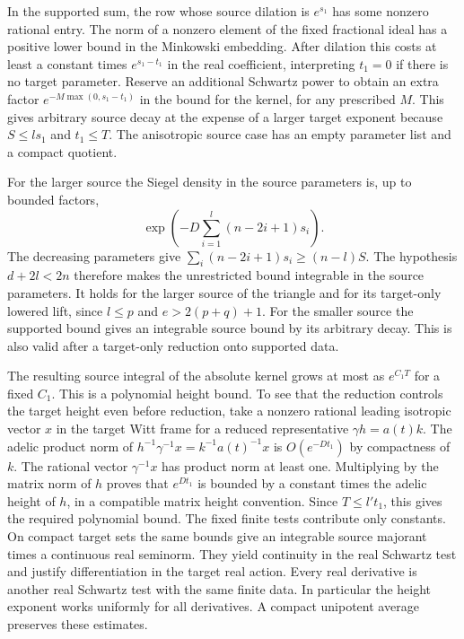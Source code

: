 In the supported sum, the row whose source dilation is \(e^{s_1}\)
has some nonzero rational entry. The norm of a nonzero element
of the fixed fractional ideal has a positive lower bound in the
Minkowski embedding. After dilation this costs at least a constant
times \(e^{s_1-t_1}\) in the real coefficient, interpreting \(t_1=0\)
if there is no target parameter. Reserve an additional Schwartz
power to obtain an extra factor \(e^{-M\max(0,s_1-t_1)}\) in
the bound for the kernel, for any prescribed \(M\). This gives
arbitrary source decay at the expense of a larger target exponent
because \(S\le l s_1\) and \(t_1\le T\). The anisotropic source
case has an empty parameter list and a compact quotient.

For the larger source the Siegel density in the source parameters
is, up to bounded factors,
\[
 \exp\!\left(-D\sum_{i=1}^l(n-2i+1)s_i\right).
\]
The decreasing parameters give
\(\sum_i(n-2i+1)s_i\ge(n-l)S\). The hypothesis
\(d+2l<2n\) therefore makes the unrestricted bound integrable
in the source parameters. It holds for the larger source of the
triangle and for its target-only lowered lift, since \(l\le p\)
and \(e>2(p+q)+1\). For the smaller source the supported bound
gives an integrable source bound by its arbitrary decay. This is
also valid after a target-only reduction onto supported data.

The resulting source integral of the absolute kernel grows at
most as \(e^{C_1 T}\) for a fixed \(C_1\). This is a polynomial
height bound. To see that the reduction controls the target
height even before reduction, take a nonzero rational leading
isotropic vector \(x\) in the target Witt frame for a reduced
representative \(\gamma h=a(t)k\). The adelic product norm of
\(h^{-1}\gamma^{-1}x=k^{-1}a(t)^{-1}x\) is
\(O(e^{-D t_1})\) by compactness of \(k\). The rational vector
\(\gamma^{-1}x\) has product norm at least one. Multiplying by
the matrix norm of \(h\) proves that \(e^{D t_1}\) is bounded by
a constant times the adelic height of \(h\), in a compatible
matrix height convention. Since \(T\le l't_1\), this gives the
required polynomial bound. The fixed finite tests contribute
only constants. On compact target sets the same bounds give an
integrable source majorant times a continuous real seminorm. They
yield continuity in the real Schwartz test and justify differentiation
in the target real action. Every real derivative is another real
Schwartz test with the same finite data. In particular the height
exponent works uniformly for all derivatives. A compact unipotent
average preserves these estimates.

